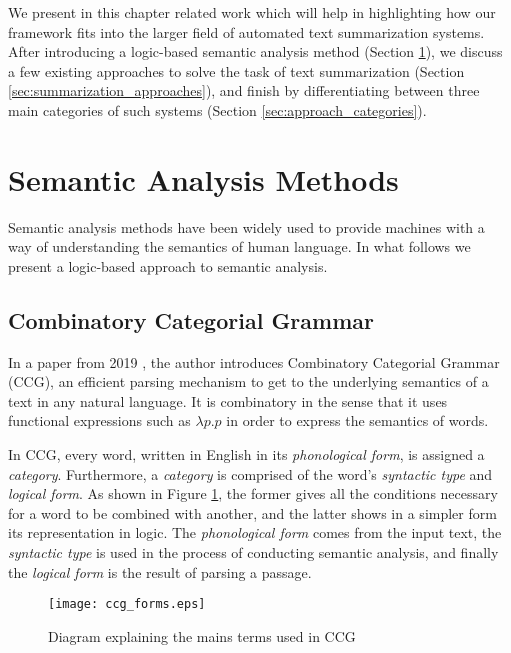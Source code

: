 \label{chapter:related_work}

We present in this chapter related work which will help in highlighting how our framework fits into the larger field of automated text summarization systems. After introducing a logic-based semantic analysis method (Section \ref{sec:semantic_analysis_methods}), we discuss a few existing approaches to solve the task of text summarization (Section \ref{sec:summarization_approaches}), and finish by differentiating between three main categories of such systems (Section \ref{sec:approach_categories}).

\section{Semantic Analysis Methods}
\label{sec:semantic_analysis_methods}

Semantic analysis methods have been widely used to provide machines with a way of understanding the semantics of human language. In what follows we present a logic-based approach to semantic analysis.

\subsection{Combinatory Categorial Grammar}
\label{ssec:ccg}

In a paper from 2019 \cite{steedman_combinatory_nodate}, the author introduces Combinatory Categorial Grammar (CCG), an efficient parsing mechanism to get to the underlying semantics of a text in any natural language. It is combinatory in the sense that it uses functional expressions such as $\lambda p.p$ in order to express the semantics of words.

In CCG, every word, written in English in its \textit{phonological form}, is assigned a \textit{category}. Furthermore, a \textit{category} is comprised of the word's \textit{syntactic type} and \textit{logical form}. As shown in Figure \ref{fig:ccg_forms}, the former gives all the conditions necessary for a word to be combined with another, and the latter shows in a simpler form its representation in logic. The \textit{phonological form} comes from the input text, the \textit{syntactic type} is used in the process of conducting semantic analysis, and finally the \textit{logical form} is the result of parsing a passage.

\begin{figure}[H]
\centering
\texttt{[image: ccg\_forms.eps]}
\caption{\cite{steedman_combinatory_nodate} Diagram explaining the mains terms used in CCG}
\label{fig:ccg_forms}
\end{figure}


